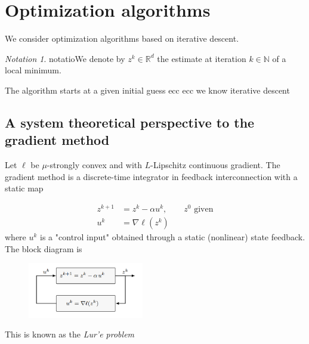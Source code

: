 \documentclass{book}
\newcommand{\R}{\mathbb{R}}
\newcommand{\N}{\mathbb{N}}
\theoremstyle{theoremv2}
\theoremstyle{defv2}
\theoremstyle{remark}
\theoremstyle{remark}
\newtheorem*{notation}{Notation}
\theoremstyle{definition}
\theoremstyle{definition}
\begin{document}
\section{Optimization algorithms}
We consider optimization algorithms based on iterative descent.
\begin{notation}
    notatioWe denote by $z^k\in\R^d$ the estimate at iteration $k\in\N$ of a local minimum. 
\end{notation}
The algorithm starts at a given initial guess ecc ecc we know iterative descent
\subsection{A system theoretical perspective to the gradient method}
Let $\ell$ be $\mu$-strongly convex and with $L$-Lipschitz continuous gradient. The gradient method is a discrete-time integrator in feedback interconnection with a static map

\begin{align*}
    z^{k+1} &= z^k-\alpha u^k, \qquad  z^0 \text{ given}\\ 
    u^k &= \nabla \ell(z^k)
\end{align*}
where $u^k$ is a "control input" obtained through a static (nonlinear) state feedback. The block diagram is 
\begin{figure}[h]
    \center
    \includegraphics[width=0.45\textwidth]{figures/gradmthd}
\end{figure}


This is known as the \emph{Lur'e problem}
\end{document}
